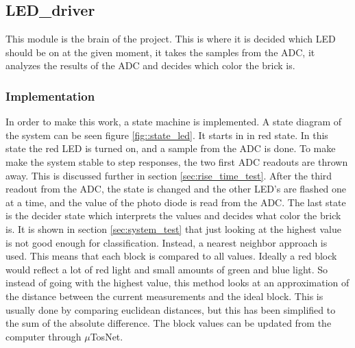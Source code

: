 \subsection{LED\_driver}
This module is the brain of the project. This is where it is decided which LED should be on at the given moment, it takes the samples from the ADC, it analyzes the results of the ADC and decides which color the brick is.

\subsubsection{Implementation}
In order to make this work, a state machine is implemented. 
A state diagram of the system can be seen figure \ref{fig::state_led}. 
It starts in in red state. 
In this state the red LED is turned on, and a sample from the ADC is done. 
To make make the system stable to step responses, the two first ADC readouts are thrown away.
This is discussed further in section \ref{sec:rise_time_test}.
After the third readout from the ADC, the state is changed and the other LED's are flashed one at a time, and the value of the photo diode is read from the ADC. 
The last state is the decider state which interprets the values and decides what color the brick is.
It is shown in section \ref{sec:system_test} that just looking at the highest value is not good enough for classification.
Instead, a nearest neighbor approach is used.
This means that each block is compared to all values.
Ideally a red block would reflect a lot of red light and small amounts of green and blue light.
So instead of going with the highest value, this method looks at an approximation of the distance between the current measurements and the ideal block.
This is usually done by comparing euclidean distances, but this has been simplified to the sum of the absolute difference.
The block values can be updated from the computer through $\mu$TosNet. 


